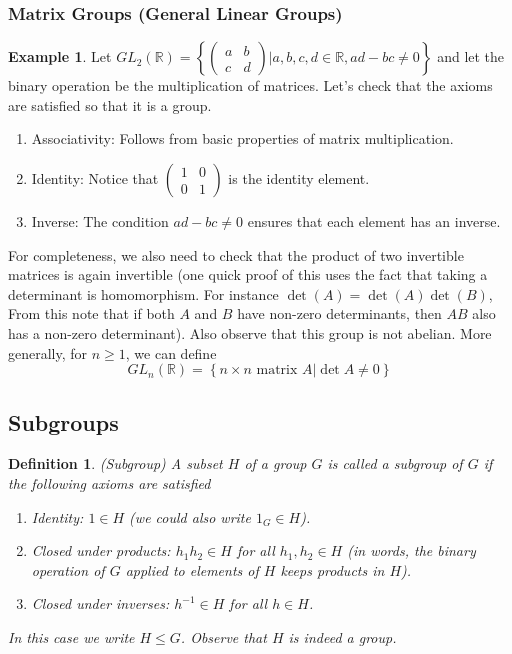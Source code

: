 \documentclass[12pt]{article}
\newtheorem{definition}{Definition}
\theoremstyle{definition}
\newtheorem{example}{Example}
\theoremstyle{definition}
\begin{document}
\subsubsection{Matrix Groups (General Linear Groups)}
\begin{example}
Let $GL_2(\mathbb{R}) = \left\{ \begin{pmatrix} a & b \\ c & d \end{pmatrix} \Big\vert a,b,c,d \in \mathbb{R}, ad-bc \neq 0 \right\}$ and let the binary operation be the multiplication of matrices. Let's check that the axioms are satisfied so that it is a group.
\begin{enumerate}
\item Associativity: Follows from basic properties of matrix multiplication. 
\item Identity: Notice that $\begin{pmatrix} 1 & 0 \\ 0 & 1 \end{pmatrix}$ is the identity element.
\item Inverse: The condition $ad-bc \neq 0$ ensures that each element has an inverse.
\end{enumerate}
For completeness, we also need to check that the product of two invertible matrices is again invertible (one quick proof of this uses the fact that taking a determinant is homomorphism. For instance $\det(A) = \det(A)\det(B)$, From this note that if both $A$ and $B$ have non-zero determinants, then $AB$ also has a non-zero determinant). Also observe that this group is not abelian. More generally, for $n\geq 1$, we can define
\begin{equation}
GL_n(\mathbb{R}) = \left\{ n\times n \text{ matrix } A \Big\vert \det{A} \neq 0 \right\}
\end{equation}
\end{example}

\subsection{Subgroups}
\begin{definition}(Subgroup)
A subset $H$ of a group $G$ is called a subgroup of $G$ if the following axioms are satisfied
\begin{enumerate}
\item Identity: $1 \in H$ (we could also write $1_G \in H$).
\item Closed under products: $h_1 h_2 \in H$ for all $h_1, h_2 \in H$ (in words, the binary operation of $G$ applied to elements of $H$ keeps products in $H$). 
\item Closed under inverses: $h^{-1} \in H$ for all $h\in H$. 
\end{enumerate}
In this case we write $H \leq G$. Observe that $H$ is indeed a group.
\end{definition}
\end{document}
